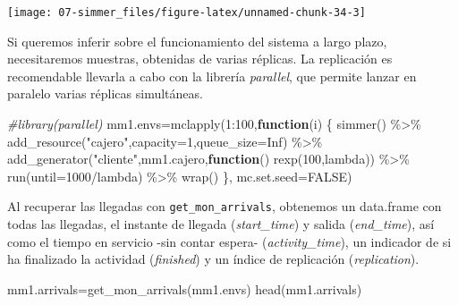 \documentclass[
]{book}
\newenvironment{Shaded}{\begin{snugshade}}{\end{snugshade}}
\newcommand{\AttributeTok}[1]{\textcolor[rgb]{0.77,0.63,0.00}{#1}}
\newcommand{\CommentTok}[1]{\textcolor[rgb]{0.56,0.35,0.01}{\textit{#1}}}
\newcommand{\ConstantTok}[1]{\textcolor[rgb]{0.00,0.00,0.00}{#1}}
\newcommand{\ControlFlowTok}[1]{\textcolor[rgb]{0.13,0.29,0.53}{\textbf{#1}}}
\newcommand{\DecValTok}[1]{\textcolor[rgb]{0.00,0.00,0.81}{#1}}
\newcommand{\FunctionTok}[1]{\textcolor[rgb]{0.00,0.00,0.00}{#1}}
\newcommand{\NormalTok}[1]{#1}
\newcommand{\OtherTok}[1]{\textcolor[rgb]{0.56,0.35,0.01}{#1}}
\newcommand{\SpecialCharTok}[1]{\textcolor[rgb]{0.00,0.00,0.00}{#1}}
\newcommand{\StringTok}[1]{\textcolor[rgb]{0.31,0.60,0.02}{#1}}
\theoremstyle{definition}
\theoremstyle{definition}
\theoremstyle{definition}
\theoremstyle{definition}
\theoremstyle{remark}
\begin{document}
\begin{center}\texttt{[image: 07-simmer\_files/figure-latex/unnamed-chunk-34-3]} \end{center}

Si queremos inferir sobre el funcionamiento del sistema a largo plazo, necesitaremos muestras, obtenidas de varias réplicas. La replicación es recomendable llevarla a cabo con la librería \emph{parallel}, que permite lanzar en paralelo varias réplicas simultáneas.

\begin{Shaded}
\begin{Highlighting}[]
\CommentTok{\#library(parallel)}
\NormalTok{mm1.envs}\OtherTok{=}\FunctionTok{mclapply}\NormalTok{(}\DecValTok{1}\SpecialCharTok{:}\DecValTok{100}\NormalTok{,}\ControlFlowTok{function}\NormalTok{(i) \{ }
     \FunctionTok{simmer}\NormalTok{() }\SpecialCharTok{\%\textgreater{}\%}
        \FunctionTok{add\_resource}\NormalTok{(}\StringTok{"cajero"}\NormalTok{,}\AttributeTok{capacity=}\DecValTok{1}\NormalTok{,}\AttributeTok{queue\_size=}\ConstantTok{Inf}\NormalTok{) }\SpecialCharTok{\%\textgreater{}\%}
        \FunctionTok{add\_generator}\NormalTok{(}\StringTok{"cliente"}\NormalTok{,mm1.cajero,}\ControlFlowTok{function}\NormalTok{() }\FunctionTok{rexp}\NormalTok{(}\DecValTok{100}\NormalTok{,lambda)) }\SpecialCharTok{\%\textgreater{}\%}
        \FunctionTok{run}\NormalTok{(}\AttributeTok{until=}\DecValTok{1000}\SpecialCharTok{/}\NormalTok{lambda) }\SpecialCharTok{\%\textgreater{}\%}
       \FunctionTok{wrap}\NormalTok{()}
\NormalTok{     \}, }\AttributeTok{mc.set.seed=}\ConstantTok{FALSE}\NormalTok{)}
\end{Highlighting}
\end{Shaded}

Al recuperar las llegadas con \texttt{get\_mon\_arrivals}, obtenemos un data.frame con todas las llegadas, el instante de llegada (\emph{start\_time}) y salida (\emph{end\_time}), así como el tiempo en servicio -sin contar espera- (\emph{activity\_time}), un indicador de si ha finalizado la actividad (\emph{finished}) y un índice de replicación (\emph{replication}).

\begin{Shaded}
\begin{Highlighting}[]
\NormalTok{mm1.arrivals}\OtherTok{=}\FunctionTok{get\_mon\_arrivals}\NormalTok{(mm1.envs) }
\FunctionTok{head}\NormalTok{(mm1.arrivals)}
\end{Highlighting}
\end{Shaded}
\end{document}
